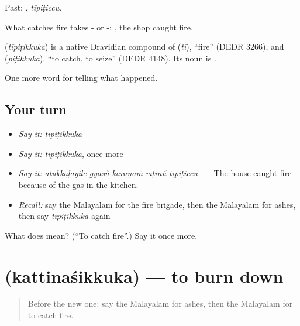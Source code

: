 Past: , \emph{tīpiṭiccu}.

What catches fire takes - or -:  , the shop caught fire.

\begin{cousinweb}
\textbf{} (\emph{tīpiṭikkuka}) is a native Dravidian compound of  (\emph{tī}), \textquotedblleft{}fire\textquotedblright{} (DEDR 3266), and  (\emph{piṭikkuka}), \textquotedblleft{}to catch, to seize\textquotedblright{} (DEDR 4148). Its noun is .
\end{cousinweb}

\begin{grammarlens}[title={What you've built}]
One more word for telling what happened.
\end{grammarlens}

\subsection*{Your turn}
\begin{itemize}
\raggedright
  \item \emph{Say it:} \emph{tīpiṭikkuka}
  \item \emph{Say it:} \emph{tīpiṭikkuka}, once more
  \item \emph{Say it:} \emph{aṭukkaḷayile gyāsŭ kāraṇaṁ vīṭinŭ tīpiṭiccu.} — The house caught fire because of the gas in the kitchen.
  \item \emph{Recall:} say the Malayalam for the fire brigade, then the Malayalam for ashes, then say \emph{tīpiṭikkuka} again
\end{itemize}

\begin{tcolorbox}[breakable,colback=teal!4,colframe=teal!35!black,title={Before you move on}]
What does  mean? (\textquotedblleft{}To catch fire\textquotedblright{}.) Say it once more.
\end{tcolorbox}
\section[\texorpdfstring{\ml{കത്തിനശിക്കുക} (kattinaśikkuka)}{കത്തിനശിക്കുക (kattinaśikkuka)}]{ (kattinaśikkuka) — to burn down}

\label{lesson:ML-C362-kattinasikkuka}



\begin{quote}
Before the new one: say the Malayalam for ashes, then the Malayalam for to catch fire.
\end{quote}


